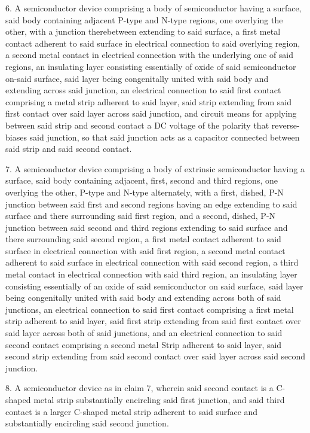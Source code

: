 6. A semiconductor device comprising a body of semiconductor having a surface, said body containing adjacent P-type and N-type regions, one overlying the other, with a junction therebetween extending to said surface, a first metal contact adherent to said surface in electrical connection to said overlying region, a second metal contact in electrical connection with the underlying one of said regions, an insulating layer consisting essentially of oxide of said semiconductor on-said surface, said layer being congenitally united with said body and extending across said junction, an electrical connection to said first contact comprising a metal strip adherent to said layer, said strip extending from said first contact over said layer across said junction, and circuit means for applying between said strip and second contact a DC voltage of the polarity that reverse-biases said junction, so that said junction acts as a capacitor connected between said strip and said second contact.

7. A semiconductor device comprising a body of extrinsic semiconductor having a surface, said body containing adjacent, first, second and third regions, one overlying the other, P-type and N-type alternately, with a first, dished, P-N junction between said first and second regions having an edge extending to said surface and there surrounding said first region, and a second, dished, P-N junction between said second and third regions extending to said surface and there surrounding said second region, a first metal contact adherent to said surface in electrical connection with said first region, a second metal contact adherent to said surface in electrical connection with said second region, a third metal contact in electrical connection with said third region, an insulating layer consisting essentially of an oxide of said semiconductor on said surface, said layer being congenitally united with said body and extending across both of said junctions, an electrical connection to said first contact comprising a first metal strip adherent to said layer, said first strip extending from said first contact over said layer across both of said junctions, and an electrical connection to said second contact comprising a second metal Strip adherent to said layer, said second strip extending from said second contact over said layer across said second junction.

8. A semiconductor device as in claim 7, wherein said second contact is a C-shaped metal strip substantially encircling said first junction, and said third contact is a larger C-shaped metal strip adherent to said surface and substantially encircling said second junction.

